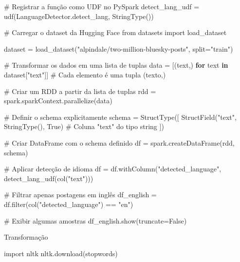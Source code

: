 \documentclass[
  letterpaper,
  DIV=11,
  numbers=noendperiod]{scrartcl}
\newenvironment{Shaded}{\begin{snugshade}}{\end{snugshade}}
\newcommand{\BuiltInTok}[1]{\textcolor[rgb]{0.00,0.23,0.31}{#1}}
\newcommand{\CommentTok}[1]{\textcolor[rgb]{0.37,0.37,0.37}{#1}}
\newcommand{\ControlFlowTok}[1]{\textcolor[rgb]{0.00,0.23,0.31}{\textbf{#1}}}
\newcommand{\ImportTok}[1]{\textcolor[rgb]{0.00,0.46,0.62}{#1}}
\newcommand{\KeywordTok}[1]{\textcolor[rgb]{0.00,0.23,0.31}{\textbf{#1}}}
\newcommand{\NormalTok}[1]{\textcolor[rgb]{0.00,0.23,0.31}{#1}}
\newcommand{\OperatorTok}[1]{\textcolor[rgb]{0.37,0.37,0.37}{#1}}
\newcommand{\StringTok}[1]{\textcolor[rgb]{0.13,0.47,0.30}{#1}}
\newcommand{\VariableTok}[1]{\textcolor[rgb]{0.07,0.07,0.07}{#1}}
\begin{document}
\begin{Shaded}
\begin{Highlighting}[]
\CommentTok{\# Registrar a função como UDF no PySpark}
\NormalTok{detect\_lang\_udf }\OperatorTok{=}\NormalTok{ udf(LanguageDetector.detect\_lang, StringType())}

\CommentTok{\# Carregar o dataset da Hugging Face}
\ImportTok{from}\NormalTok{ datasets }\ImportTok{import}\NormalTok{ load\_dataset}

\NormalTok{dataset }\OperatorTok{=}\NormalTok{ load\_dataset(}\StringTok{"alpindale/two{-}million{-}bluesky{-}posts"}\NormalTok{, split}\OperatorTok{=}\StringTok{"train"}\NormalTok{)}

\CommentTok{\# Transformar os dados em uma lista de tuplas}
\NormalTok{data }\OperatorTok{=}\NormalTok{ [(text,) }\ControlFlowTok{for}\NormalTok{ text }\KeywordTok{in}\NormalTok{ dataset[}\StringTok{"text"}\NormalTok{]]  }\CommentTok{\# Cada elemento é uma tupla (texto,)}

\CommentTok{\# Criar um RDD a partir da lista de tuplas}
\NormalTok{rdd }\OperatorTok{=}\NormalTok{ spark.sparkContext.parallelize(data)}

\CommentTok{\# Definir o schema explicitamente}
\NormalTok{schema }\OperatorTok{=}\NormalTok{ StructType([}
\NormalTok{    StructField(}\StringTok{"text"}\NormalTok{, StringType(), }\VariableTok{True}\NormalTok{)  }\CommentTok{\# Coluna "text" do tipo string}
\NormalTok{])}

\CommentTok{\# Criar DataFrame com o schema definido}
\NormalTok{df }\OperatorTok{=}\NormalTok{ spark.createDataFrame(rdd, schema)}

\CommentTok{\# Aplicar detecção de idioma}
\NormalTok{df }\OperatorTok{=}\NormalTok{ df.withColumn(}\StringTok{"detected\_language"}\NormalTok{, detect\_lang\_udf(col(}\StringTok{"text"}\NormalTok{)))}

\CommentTok{\# Filtrar apenas postagens em inglês}
\NormalTok{df\_english }\OperatorTok{=}\NormalTok{ df.}\BuiltInTok{filter}\NormalTok{(col(}\StringTok{"detected\_language"}\NormalTok{) }\OperatorTok{==} \StringTok{"en"}\NormalTok{)}

\CommentTok{\# Exibir algumas amostras}
\NormalTok{df\_english.show(truncate}\OperatorTok{=}\VariableTok{False}\NormalTok{)}
\end{Highlighting}
\end{Shaded}

Transformação

\begin{Shaded}
\begin{Highlighting}[]
\ImportTok{import}\NormalTok{ nltk}
\NormalTok{nltk.download(}\StringTok{\textquotesingle{}stopwords\textquotesingle{}}\NormalTok{)}
\end{Highlighting}
\end{Shaded}
\end{document}
